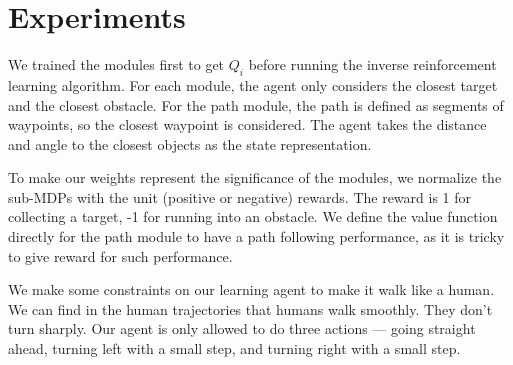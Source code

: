 \documentclass[11pt]{article} %
\begin{document}
\section{Experiments}
\label{sec:exp}

We trained the modules first to get $Q_i$ before running the inverse reinforcement
learning algorithm. For each module, the agent only considers the closest target
and the closest obstacle. For the path module, the path is defined as segments
of waypoints, so the closest waypoint is considered. The agent takes the
distance and angle to the closest objects as the state representation.

To make our weights represent the significance of the modules, we
normalize the sub-MDPs with the unit (positive or negative) rewards. The reward
is 1 for collecting a target, -1 for running into an obstacle. We define the
value function directly for the path module to have a path following
performance, as it is tricky to give reward for such performance.

We make some constraints on our learning agent to make it walk like a human.
We can find in the human trajectories that humans walk smoothly. They don't turn
sharply.  Our agent is only allowed to do three actions --- going straight ahead,
turning left with a small step, and turning right with a small step.
\end{document}
